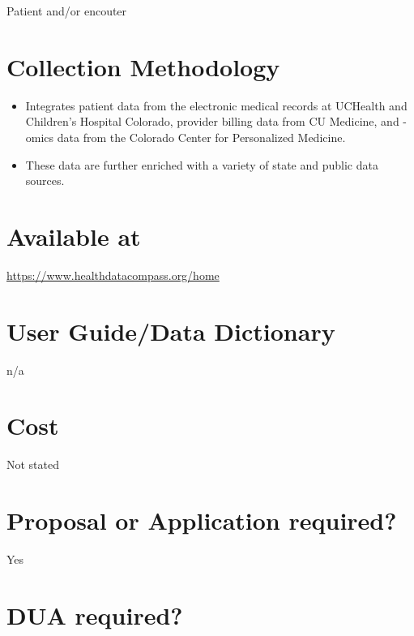 \documentclass[
]{book}
\providecommand{\tightlist}{%
  \setlength{\itemsep}{0pt}\setlength{\parskip}{0pt}}
\begin{document}
Patient and/or encouter

\hypertarget{collection-methodology-31}{%
\section{Collection Methodology}\label{collection-methodology-31}}

\begin{itemize}
\tightlist
\item
  Integrates patient data from the electronic medical records at UCHealth and Children's Hospital Colorado, provider billing data from CU Medicine, and -omics data from the Colorado Center for Personalized Medicine.
\item
  These data are further enriched with a variety of state and public data sources.
\end{itemize}

\hypertarget{available-at-31}{%
\section{Available at}\label{available-at-31}}

\url{https://www.healthdatacompass.org/home}

\hypertarget{user-guidedata-dictionary-31}{%
\section{User Guide/Data Dictionary}\label{user-guidedata-dictionary-31}}

n/a

\hypertarget{cost-31}{%
\section{Cost}\label{cost-31}}

Not stated

\hypertarget{proposal-or-application-required-31}{%
\section{Proposal or Application required?}\label{proposal-or-application-required-31}}

Yes

\hypertarget{dua-required-31}{%
\section{DUA required?}\label{dua-required-31}}
\end{document}
